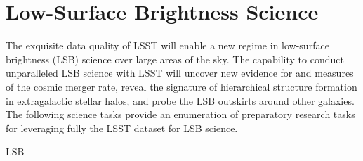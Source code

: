 \section{Low-Surface Brightness Science}\label{sec:tasks:lsb}  

The exquisite data quality of LSST will enable a new regime in
low-surface brightness (LSB) science over large areas of the sky. The capability
to conduct unparalleled LSB science with LSST will uncover new
evidence for and measures of the cosmic merger rate, reveal the
signature of hierarchical structure formation in extragalactic stellar
halos, and probe the LSB outskirts around other galaxies. The following
science tasks provide an enumeration of preparatory research tasks for
leveraging fully the LSST dataset for LSB science.

\begin{tasklist}{LSB}

\end{tasklist}
